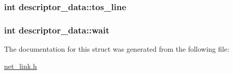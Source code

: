\hypertarget{structdescriptor__data_a5236d67527a8b6f1cf5fabb0760e3b20}{
\subsubsection[{tos\-\_\-line}]{\setlength{\rightskip}{0pt plus 5cm}int descriptor\-\_\-data\-::tos\-\_\-line}}\label{structdescriptor__data_a5236d67527a8b6f1cf5fabb0760e3b20}
\hypertarget{structdescriptor__data_afc7b938bbe08cdfb70ee8c7dab22b386}{
\subsubsection[{wait}]{\setlength{\rightskip}{0pt plus 5cm}int descriptor\-\_\-data\-::wait}}\label{structdescriptor__data_afc7b938bbe08cdfb70ee8c7dab22b386}


The documentation for this struct was generated from the following file\-:\begin{DoxyCompactItemize}
\item 
\hyperlink{net__link_8h}{net\-\_\-link.\-h}\end{DoxyCompactItemize}
